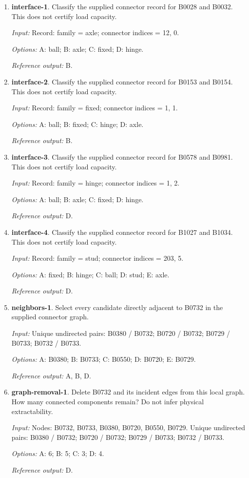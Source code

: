 \begin{enumerate}
\item \textbf{interface-1}. Classify the supplied connector record for B0028 and B0032. This does not certify load capacity.\par {\small \textit{Input:} Record: family = axle; connector indices = 12, 0. \par\textit{Options:} A: ball; B: axle; C: fixed; D: hinge. \par\textit{Reference output:} B.}
\item \textbf{interface-2}. Classify the supplied connector record for B0153 and B0154. This does not certify load capacity.\par {\small \textit{Input:} Record: family = fixed; connector indices = 1, 1. \par\textit{Options:} A: ball; B: fixed; C: hinge; D: axle. \par\textit{Reference output:} B.}
\item \textbf{interface-3}. Classify the supplied connector record for B0578 and B0981. This does not certify load capacity.\par {\small \textit{Input:} Record: family = hinge; connector indices = 1, 2. \par\textit{Options:} A: ball; B: axle; C: fixed; D: hinge. \par\textit{Reference output:} D.}
\item \textbf{interface-4}. Classify the supplied connector record for B1027 and B1034. This does not certify load capacity.\par {\small \textit{Input:} Record: family = stud; connector indices = 203, 5. \par\textit{Options:} A: fixed; B: hinge; C: ball; D: stud; E: axle. \par\textit{Reference output:} D.}
\item \textbf{neighbors-1}. Select every candidate directly adjacent to B0732 in the supplied connector graph.\par {\small \textit{Input:} Unique undirected pairs: B0380 / B0732; B0720 / B0732; B0729 / B0733; B0732 / B0733. \par\textit{Options:} A: B0380; B: B0733; C: B0550; D: B0720; E: B0729. \par\textit{Reference output:} A, B, D.}
\item \textbf{graph-removal-1}. Delete B0732 and its incident edges from this local graph. How many connected components remain? Do not infer physical extractability.\par {\small \textit{Input:} Nodes: B0732, B0733, B0380, B0720, B0550, B0729. Unique undirected pairs: B0380 / B0732; B0720 / B0732; B0729 / B0733; B0732 / B0733. \par\textit{Options:} A: 6; B: 5; C: 3; D: 4. \par\textit{Reference output:} D.}

\end{enumerate}
